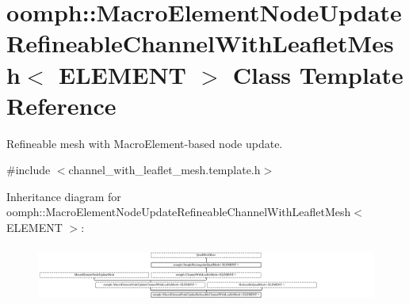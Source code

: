 \hypertarget{classoomph_1_1MacroElementNodeUpdateRefineableChannelWithLeafletMesh}{}\section{oomph\+:\+:Macro\+Element\+Node\+Update\+Refineable\+Channel\+With\+Leaflet\+Mesh$<$ E\+L\+E\+M\+E\+NT $>$ Class Template Reference}
\label{classoomph_1_1MacroElementNodeUpdateRefineableChannelWithLeafletMesh}


Refineable mesh with Macro\+Element-\/based node update.  




{\ttfamily \#include $<$channel\+\_\+with\+\_\+leaflet\+\_\+mesh.\+template.\+h$>$}

Inheritance diagram for oomph\+:\+:Macro\+Element\+Node\+Update\+Refineable\+Channel\+With\+Leaflet\+Mesh$<$ E\+L\+E\+M\+E\+NT $>$\+:\begin{figure}[H]
\begin{center}
\leavevmode
\includegraphics[height=1.885522cm]{classoomph_1_1MacroElementNodeUpdateRefineableChannelWithLeafletMesh}
\end{center}
\end{figure}
